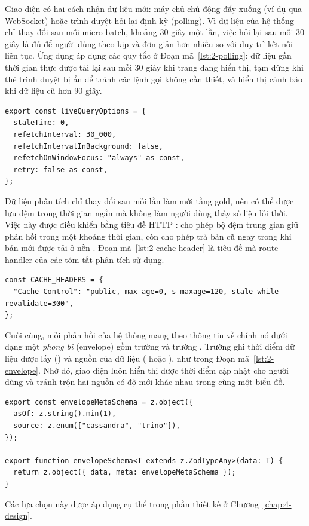 Giao diện có hai cách nhận dữ liệu mới: máy chủ chủ động đẩy xuống (ví dụ qua WebSocket) hoặc trình duyệt hỏi lại định kỳ (polling). Vì dữ liệu của hệ thống chỉ thay đổi sau mỗi micro-batch, khoảng 30 giây một lần, việc hỏi lại sau mỗi 30 giây là đủ để người dùng theo kịp và đơn giản hơn nhiều so với duy trì kết nối liên tục. Ứng dụng áp dụng các quy tắc ở Đoạn mã~\ref{lst:2-polling}: dữ liệu gần thời gian thực được tải lại sau mỗi 30 giây khi trang đang hiển thị, tạm dừng khi thẻ trình duyệt bị ẩn để tránh các lệnh gọi không cần thiết, và hiển thị cảnh báo khi dữ liệu cũ hơn 90 giây.

\begin{lstlisting}[caption={Tùy chọn tải lại dữ liệu gần thời gian thực}, label={lst:2-polling}]
export const liveQueryOptions = {
  staleTime: 0,
  refetchInterval: 30_000,
  refetchIntervalInBackground: false,
  refetchOnWindowFocus: "always" as const,
  retry: false as const,
};
\end{lstlisting}

Dữ liệu phân tích chỉ thay đổi sau mỗi lần làm mới tầng gold, nên có thể được lưu đệm trong thời gian ngắn mà không làm người dùng thấy số liệu lỗi thời. Việc này được điều khiển bằng tiêu đề HTTP :  cho phép bộ đệm trung gian giữ phản hồi trong một khoảng thời gian, còn  cho phép trả bản cũ ngay trong khi bản mới được tải ở nền \cite{rfc9111,rfc5861}. Đoạn mã~\ref{lst:2-cache-header} là tiêu đề mà route handler của các tóm tắt phân tích sử dụng.

\begin{lstlisting}[caption={Tiêu đề lưu đệm (cache headers) của route handler phân tích}, label={lst:2-cache-header}]
const CACHE_HEADERS = {
  "Cache-Control": "public, max-age=0, s-maxage=120, stale-while-revalidate=300",
};
\end{lstlisting}

Cuối cùng, mỗi phản hồi của hệ thống mang theo thông tin về chính nó dưới dạng một \emph{phong bì} (envelope) gồm trường  và trường . Trường  ghi thời điểm dữ liệu được lấy () và nguồn của dữ liệu ( hoặc ), như trong Đoạn mã~\ref{lst:2-envelope}. Nhờ đó, giao diện luôn hiển thị được thời điểm cập nhật cho người dùng và tránh trộn hai nguồn có độ mới khác nhau trong cùng một biểu đồ.

\begin{lstlisting}[caption={Cấu trúc phong bì của phản hồi (\texttt{web/src/lib/api/schemas.ts})}, label={lst:2-envelope}]
export const envelopeMetaSchema = z.object({
  asOf: z.string().min(1),
  source: z.enum(["cassandra", "trino"]),
});

export function envelopeSchema<T extends z.ZodTypeAny>(data: T) {
  return z.object({ data, meta: envelopeMetaSchema });
}
\end{lstlisting}

Các lựa chọn này được áp dụng cụ thể trong phần thiết kế ở Chương~\ref{chap:4-design}.
